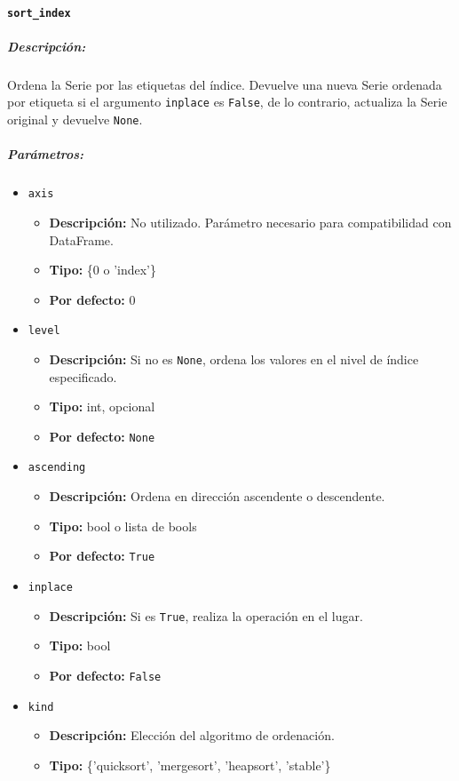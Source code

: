 \paragraph{\texttt{sort\_index}}
\subparagraph{Descripción:}
Ordena la Serie por las etiquetas del índice. Devuelve una nueva Serie ordenada por etiqueta si el argumento \texttt{inplace} es \texttt{False}, de lo contrario, actualiza la Serie original y devuelve \texttt{None}.
\subparagraph{Parámetros:}
\begin{itemize}
\item \texttt{axis}
\begin{itemize}
\item \textbf{Descripción:} No utilizado. Parámetro necesario para compatibilidad con DataFrame.
\item \textbf{Tipo:} \{0 o 'index'\}
\item \textbf{Por defecto:} 0
\end{itemize}
\item \texttt{level}
\begin{itemize}
\item \textbf{Descripción:} Si no es \texttt{None}, ordena los valores en el nivel de índice especificado.
\item \textbf{Tipo:} int, opcional
\item \textbf{Por defecto:} \texttt{None}
\end{itemize}
\item \texttt{ascending}
\begin{itemize}
\item \textbf{Descripción:} Ordena en dirección ascendente o descendente.
\item \textbf{Tipo:} bool o lista de bools
\item \textbf{Por defecto:} \texttt{True}
\end{itemize}
\item \texttt{inplace}
\begin{itemize}
\item \textbf{Descripción:} Si es \texttt{True}, realiza la operación en el lugar.
\item \textbf{Tipo:} bool
\item \textbf{Por defecto:} \texttt{False}
\end{itemize}
\item \texttt{kind}
\begin{itemize}
\item \textbf{Descripción:} Elección del algoritmo de ordenación.
\item \textbf{Tipo:} \{'quicksort', 'mergesort', 'heapsort', 'stable'\}

\end{itemize}
\end{itemize}
